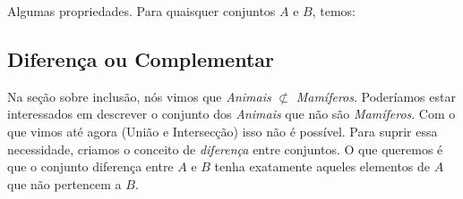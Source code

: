 Algumas propriedades. Para quaisquer conjuntos $A$ e $B$, temos:

\subsection{Diferença ou Complementar}
Na seção sobre inclusão, nós vimos que \emph{Animais} $\not \subset$ \emph{Mamíferos}. Poderíamos estar interessados em descrever o conjunto dos \emph{Animais} que não são \emph{Mamíferos}. Com o que vimos até agora (União e Intersecção) isso não é possível. Para suprir essa necessidade, criamos o conceito de \emph{diferença} entre conjuntos. O que queremos é que o conjunto diferença entre $A$ e $B$ tenha exatamente aqueles elementos de $A$ que não pertencem a $B$.

